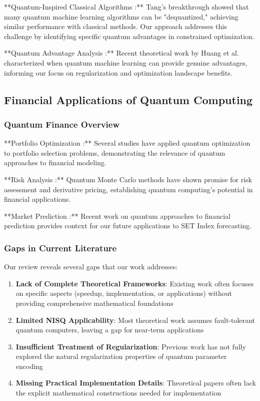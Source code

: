 \documentclass[11pt]{article}
\begin{document}
**Quantum-Inspired Classical Algorithms \cite{tang2019quantum}:** Tang's breakthrough showed that many quantum machine learning algorithms can be "dequantized," achieving similar performance with classical methods. Our approach addresses this challenge by identifying specific quantum advantages in constrained optimization.

**Quantum Advantage Analysis \cite{huang2021power}:** Recent theoretical work by Huang et al. characterized when quantum machine learning can provide genuine advantages, informing our focus on regularization and optimization landscape benefits.

\subsection{Financial Applications of Quantum Computing}

\subsubsection{Quantum Finance Overview}

**Portfolio Optimization \cite{mugel2020quantum}:** Several studies have applied quantum optimization to portfolio selection problems, demonstrating the relevance of quantum approaches to financial modeling.

**Risk Analysis \cite{woerner2019quantum}:** Quantum Monte Carlo methods have shown promise for risk assessment and derivative pricing, establishing quantum computing's potential in financial applications.

**Market Prediction \cite{kyriienko2021solving}:** Recent work on quantum approaches to financial prediction provides context for our future applications to SET Index forecasting.

\subsubsection{Gaps in Current Literature}

Our review reveals several gaps that our work addresses:

\begin{enumerate}
\item \textbf{Lack of Complete Theoretical Frameworks}: Existing work often focuses on specific aspects (speedup, implementation, or applications) without providing comprehensive mathematical foundations
\item \textbf{Limited NISQ Applicability}: Most theoretical work assumes fault-tolerant quantum computers, leaving a gap for near-term applications
\item \textbf{Insufficient Treatment of Regularization}: Previous work has not fully explored the natural regularization properties of quantum parameter encoding
\item \textbf{Missing Practical Implementation Details}: Theoretical papers often lack the explicit mathematical constructions needed for implementation
\end{enumerate}
\end{document}
